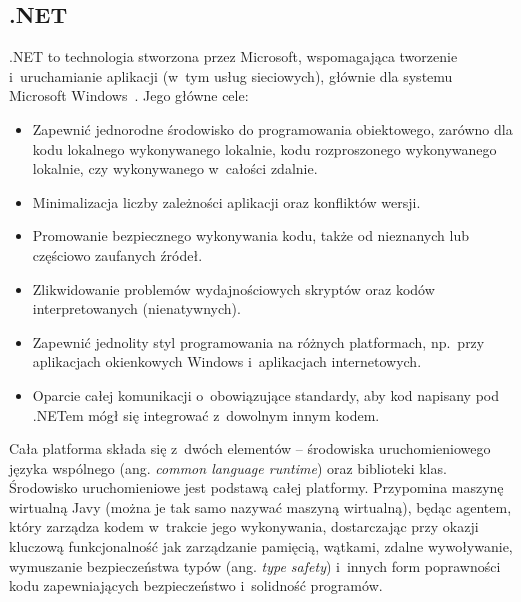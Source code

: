 

\subsection{.NET}
\label{dot-net}
.NET to technologia stworzona przez Microsoft, wspomagająca tworzenie i~uruchamianie aplikacji (w~tym usług sieciowych), głównie dla systemu Microsoft Windows~\cite{dot-net-overview}. Jego główne cele:
\begin{itemize}
	\item Zapewnić jednorodne środowisko do programowania obiektowego, zarówno dla kodu lokalnego wykonywanego lokalnie, kodu rozproszonego wykonywanego lokalnie, czy wykonywanego w~całości zdalnie.
	\item Minimalizacja liczby zależności aplikacji oraz konfliktów wersji.
	\item Promowanie bezpiecznego wykonywania kodu, także od nieznanych lub częściowo zaufanych źródeł.
	\item Zlikwidowanie problemów wydajnościowych skryptów oraz kodów interpretowanych (nienatywnych).
	\item Zapewnić jednolity styl programowania na różnych platformach, np.\ przy aplikacjach okienkowych Windows i~aplikacjach internetowych.
	\item Oparcie całej komunikacji o~obowiązujące standardy, aby kod napisany pod .NETem mógł się integrować z~dowolnym innym kodem.
\end{itemize}

Cała platforma składa się z~dwóch elementów -- środowiska uruchomieniowego języka wspólnego (ang. \emph{common language runtime}) oraz biblioteki klas. Środowisko uruchomieniowe jest podstawą całej platformy. Przypomina maszynę wirtualną Javy (można je tak samo nazywać maszyną wirtualną), będąc agentem, który zarządza kodem w~trakcie jego wykonywania, dostarczając przy okazji kluczową funkcjonalność jak zarządzanie pamięcią, wątkami, zdalne wywoływanie, wymuszanie bezpieczeństwa typów (ang. \emph{type safety}) i~innych form poprawności kodu zapewniających bezpieczeństwo i~solidność programów.

